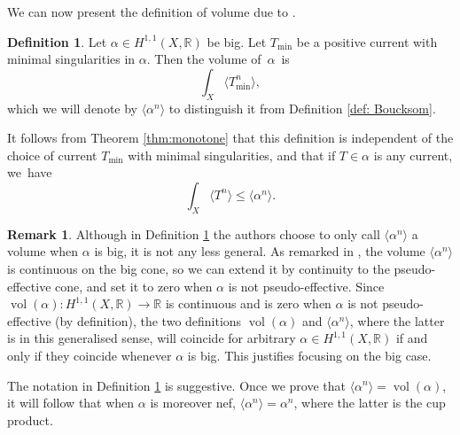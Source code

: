\documentclass[a4paper]{amsart}
\newcommand{\R}{\mathbb{R}}
\newcommand{\vol}{\operatorname{vol}}
\theoremstyle{definition}
\newtheorem{definition}[theorem]{Definition}
\newtheorem{remark}[theorem]{Remark}
\begin{document}
We can now present the definition of volume due to \cite{BEGZ}. 
\begin{definition}\cite[Definition 1.17]{BEGZ}\label{def: BEGZ}
	Let $\alpha \in H^{1, 1}(X, \R)$ be big. Let $T_{\text{min}}$ be a positive current with minimal singularities in $\alpha$. Then the volume of~$\alpha$~is
	\[\int_X \langle T_{\text{min}}^n\rangle,\]
	which we will denote by $\langle \alpha^n\rangle$ to distinguish it from Definition \ref{def: Boucksom}.
\end{definition}
It follows from Theorem \ref{thm:monotone} that this definition is independent of the choice of current $T_{\min}$ with minimal singularities, and that if $T\in \alpha$ is any current, we~have
\begin{equation}\label{eq:min}
  \int_X\langle T^n\rangle \le \langle \alpha^n\rangle.  
\end{equation}
\begin{remark}
    Although in Definition \ref{def: BEGZ} the authors choose to only call $\langle \alpha^n\rangle$ a volume when $\alpha$ is big, it is not any less general. As remarked in \cite[page 219]{BEGZ}, the volume $\langle \alpha^n\rangle$ is continuous on the big cone, so we can extend it by continuity to the pseudo-effective cone, and set it to zero when $\alpha$ is not pseudo-effective. Since $\vol(\alpha): H^{1, 1}(X, \R) \to \R$ is continuous \cite[Corollary 4.11]{Boucksom} and is zero when $\alpha$ is not pseudo-effective (by definition), the two definitions $\vol(\alpha)$ and $\langle \alpha^n\rangle$, where the latter is in this generalised sense, will coincide for arbitrary $\alpha \in H^{1, 1}(X, \R)$ if and only if they coincide whenever $\alpha$ is big. This justifies focusing on the big case.
\end{remark}
The notation in Definition \ref{def: BEGZ} is suggestive. Once we prove that $\langle \alpha^n\rangle = \vol(\alpha)$, it will follow that when $\alpha$ is moreover nef, $\langle\alpha^n\rangle = \alpha^n$, where the latter is the cup product.
\end{document}
